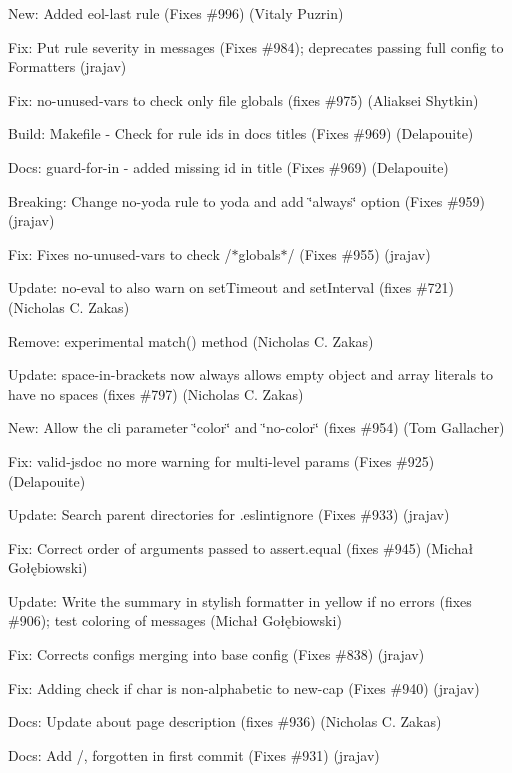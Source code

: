 \begin{DoxyItemize}
\item New\+: Added eol-\/last rule (Fixes \#996) (Vitaly Puzrin)
\item Fix\+: Put rule severity in messages (Fixes \#984); deprecates passing full config to Formatters (jrajav)
\item Fix\+: no-\/unused-\/vars to check only file globals (fixes \#975) (Aliaksei Shytkin)
\item Build\+: Makefile -\/ Check for rule ids in docs titles (Fixes \#969) (Delapouite)
\item Docs\+: guard-\/for-\/in -\/ added missing id in title (Fixes \#969) (Delapouite)
\item Breaking\+: Change \textquotesingle{}no-\/yoda\textquotesingle{} rule to \textquotesingle{}yoda\textquotesingle{} and add \char`\"{}always\char`\"{} option (Fixes \#959) (jrajav)
\item Fix\+: Fixes no-\/unused-\/vars to check /$\ast$globals$\ast$/ (Fixes \#955) (jrajav)
\item Update\+: no-\/eval to also warn on set\+Timeout and set\+Interval (fixes \#721) (Nicholas C. Zakas)
\item Remove\+: experimental match() method (Nicholas C. Zakas)
\item Update\+: space-\/in-\/brackets now always allows empty object and array literals to have no spaces (fixes \#797) (Nicholas C. Zakas)
\item New\+: Allow the cli parameter \char`\"{}color\char`\"{} and \char`\"{}no-\/color\char`\"{} (fixes \#954) (Tom Gallacher)
\item Fix\+: valid-\/jsdoc no more warning for multi-\/level params (Fixes \#925) (Delapouite)
\item Update\+: Search parent directories for .eslintignore (Fixes \#933) (jrajav)
\item Fix\+: Correct order of arguments passed to assert.\+equal (fixes \#945) (Michał Gołębiowski)
\item Update\+: Write the summary in stylish formatter in yellow if no errors (fixes \#906); test coloring of messages (Michał Gołębiowski)
\item Fix\+: Corrects configs merging into base config (Fixes \#838) (jrajav)
\item Fix\+: Adding check if char is non-\/alphabetic to new-\/cap (Fixes \#940) (jrajav)
\item Docs\+: Update about page description (fixes \#936) (Nicholas C. Zakas)
\item Docs\+: Add \textquotesingle{}/\textquotesingle{}, forgotten in first commit (Fixes \#931) (jrajav)

\end{DoxyItemize}

